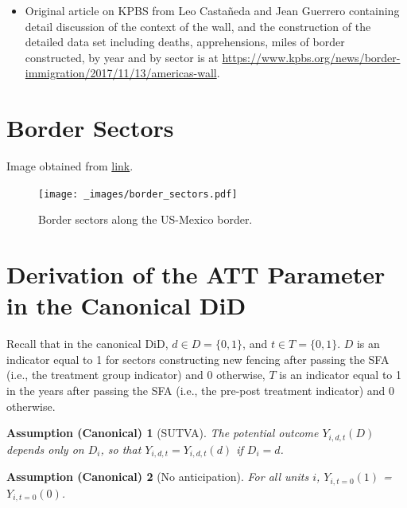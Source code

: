 \documentclass[titlepage]{article}
\theoremstyle{plain}
\theoremstyle{plain}
\newtheorem*{assumptioncanonical}{Assumption (Canonical)}
\begin{document}
\begin{itemize}
    \item Original article on KPBS from Leo Castañeda and Jean Guerrero containing detail discussion of the context of the wall, and the construction of the detailed data set including deaths, apprehensions, miles of border constructed, by year and by sector is at \newline \href{https://www.kpbs.org/news/border-immigration/2017/11/13/americas-wall}{https://www.kpbs.org/news/border-immigration/2017/11/13/americas-wall}.
\end{itemize}


\section{Border Sectors}
Image obtained from \href{https://www.reddit.com/r/MapPorn/comments/xqku83/map_of_southwestern_border_of_the_us_with_mexico/}{link}.

\begin{figure}[H]
\centering
    \caption{Border sectors along the US-Mexico border.} 
    \label{fig:border_sectors} 
    \texttt{[image: \_images/border\_sectors.pdf]}
\end{figure}

\section{Derivation of the ATT Parameter in the Canonical DiD}
\label{appendix:canonical_derivation}

Recall that in the canonical DiD, $d \in D=\{0,1\}$, and $t \in T=\{0,1\}$. $D$ is an indicator equal to 1 for sectors constructing new fencing after passing the SFA (i.e., the treatment group indicator) and 0 otherwise, $T$ is an indicator equal to 1 in the years after passing the SFA (i.e., the pre-post treatment indicator) and 0 otherwise.

\begin{assumptioncanonical}[SUTVA]
	\label{ass_can_1}
	The potential outcome $Y_{i,d,t}(D)$ depends only on $D_{i}$, so that $ Y_{i,d,t} = Y_{i,d,t}(d)$ if $D_{i} = d$.
\end{assumptioncanonical}

\begin{assumptioncanonical}[No anticipation]
	\label{ass_can_2}
	For all units $i$, $Y_{i,t=0}(1)$ = $Y_{i,t=0}(0)$.
\end{assumptioncanonical}
\end{document}
